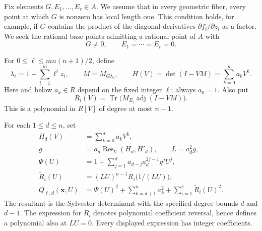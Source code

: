 \documentclass[11pt]{article}
\theoremstyle{definition}
\begin{document}
Fix elements $G,E_1,\ldots,E_r\in A$. We assume that in every geometric
fiber, every point at which $G$ is nonzero has local length one. This
condition holds, for example, if $G$ contains the product of the diagonal
derivatives $\partial f_i/\partial z_i$ as a factor. We seek the rational
base points admitting a rational point of $A$ with
\[
 G\ne0,\qquad E_1=\cdots=E_r=0.
\]

For $0\le\ell\le m n(n+1)/2$, define
\[
 \lambda_\ell=1+\sum_{i=1}^m\ell^i z_i,\qquad
 M=M_{G\lambda_\ell},\qquad
 H(V)=\det(I-VM)=\sum_{k=0}^n a_kV^k.
\]
Here and below $a_k\in R$ depend on the fixed integer $\ell$; always
$a_0=1$. Also put
\[
 R_i(V)=\operatorname{Tr}\bigl(M_{E_i}\operatorname{adj}(I-VM)\bigr).
\]
This is a polynomial in $R[V]$ of degree at most $n-1$.

For each $1\le d\le n$, set
\begin{align*}
 H_d(V)&=\sum_{k=0}^d a_kV^k,\\
 g&=a_d\operatorname{Res}_{V}(H_d,H'_d),\qquad L=a_d^2g,\\
 \Psi(U)&=1+\sum_{j=1}^d a_{d-j}a_d^{2j-1}g^jU^j,\\
 \widetilde R_i(U)&=(LU)^{n-1}R_i\bigl(1/(LU)\bigr),\\
 Q_{\ell,d}(\mathbf x,U)&=
 \Psi(U)^2+\sum_{k=d+1}^n a_k^2+\sum_{i=1}^r\widetilde R_i(U)^2.
\end{align*}
The resultant is the Sylvester determinant with the specified degree
bounds $d$ and $d-1$. The expression for $\widetilde R_i$ denotes
polynomial coefficient reversal, hence defines a polynomial also at
$LU=0$. Every displayed expression has integer coefficients.
\end{document}
